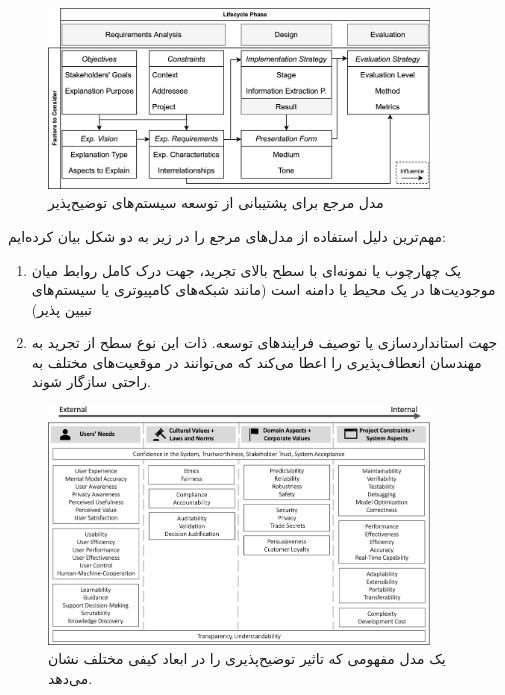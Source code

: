 \begin{figure}[H]
    \centering
    \includegraphics[width=0.9\textwidth]{images/reference_model.png}
    \caption{مدل مرجع برای پشتیبانی از توسعه سیستم‌های توضیح‌پذیر}
    \label{fig:referenceModel}
\end{figure}

مهم‌ترین دلیل استفاده از مدل‌های مرجع را در زیر به دو شکل بیان کرده‌ایم:

\begin{enumerate}
    \item یک چهارچوب یا نمونه‌ای با سطح بالای تجرید، جهت درک کامل روابط میان
    موجودیت‌ها در یک محیط یا دامنه است (مانند شبکه‌های کامپیوتری یا سیستم‌های
    تبیین پذیر)
    \item جهت استانداردسازی یا توصیف فرایند‌های توسعه. ذات این نوع سطح از تجرید
    به مهندسان انعطاف‌پذیری را اعطا می‌کند که می‌توانند در موقعیت‌های مختلف به
    راحتی سازگار شوند.
\end{enumerate}

\begin{figure}[H]
    \centering
    \includegraphics[width=0.9\textwidth]{images/conceptual_model.png}
    \caption{یک مدل مفهومی که تاثیر توضیح‌پذیری را در ابعاد کیفی مختلف نشان
    می‌دهد.}
    \label{fig:conceptualmodel}
\end{figure}

